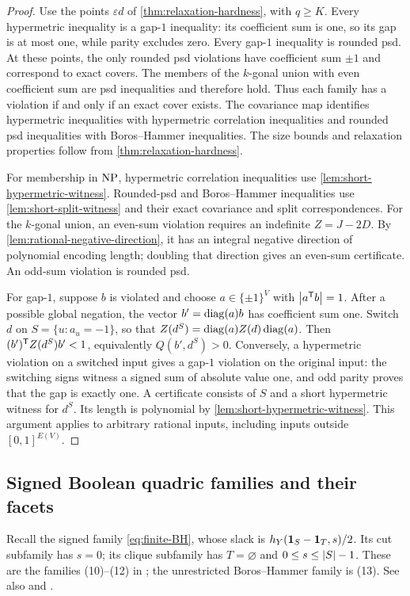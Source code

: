 \begin{proof}
Use the points $\varepsilon d$ of
\cref{thm:relaxation-hardness}, with $q\geq K$.
Every hypermetric inequality is a gap-$1$ inequality: its coefficient sum
is one, so its gap is at most one, while parity excludes zero.
Every gap-$1$ inequality is rounded psd. At these points, the only
rounded psd violations have coefficient sum $\pm1$ and correspond to
exact covers. The members of the $k$-gonal union with even coefficient
sum are psd inequalities and therefore hold.
Thus each family has a violation if and only if an exact cover exists.
The covariance map identifies hypermetric inequalities with hypermetric
correlation inequalities and rounded psd inequalities with Boros--Hammer
inequalities. The size bounds and relaxation properties follow from
\cref{thm:relaxation-hardness}.

For membership in $\mathrm{NP}$, hypermetric correlation inequalities use
\cref{lem:short-hypermetric-witness}. Rounded-psd and Boros--Hammer
inequalities use \cref{lem:short-split-witness} and their exact covariance
and split correspondences.
For the $k$-gonal union, an even-sum violation requires an indefinite
$Z=J-2D$. By \cref{lem:rational-negative-direction}, it has an integral
negative direction of polynomial encoding length; doubling that direction
gives an even-sum certificate. An odd-sum violation
is rounded psd.

For gap-$1$, suppose $b$ is violated and choose $a\in\{\pm1\}^{V}$ with
$\left\lvert a^{\mathsf T} b\right\rvert=1$. After a possible global negation, the vector
$b'=\operatorname{diag}(a)b$ has coefficient sum one. Switch $d$ on
$S=\{u:a_u=-1\}$, so that $Z(d^S)=\operatorname{diag}(a)Z(d)\operatorname{diag}(a)$.
Then $(b')^{\mathsf T} Z(d^S)b'<1$, equivalently $Q(b',d^S)>0$.
Conversely, a hypermetric violation on a switched input gives a gap-$1$
violation on the original input: the switching signs witness a signed
sum of absolute value one, and odd parity proves that the gap is exactly
one. A certificate consists of $S$ and a short hypermetric witness for
$d^S$. Its length is polynomial by
\cref{lem:short-hypermetric-witness}. This argument applies to arbitrary
rational inputs, including inputs outside $[0,1]^{E(V)}$.
\end{proof}

\subsection{Signed Boolean quadric families and their facets}

Recall the signed family \eqref{eq:finite-BH}, whose slack is
$h_Y(\mathbf 1_S-\mathbf 1_T,s)/2$. Its cut subfamily has $s=0$; its clique
subfamily has $T=\varnothing$ and $0\leq s\leq\left\lvert S\right\rvert-1$.
These are the families (10)--(12) in \citet{Letchford2022}; the
unrestricted Boros--Hammer family is (13). See also
\citet{Padberg1989} and \citet{LetchfordSorensen2012}.

